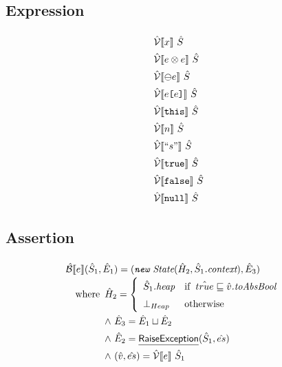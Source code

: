 \subsection{Expression}
\[
\renewcommand\arraystretch{1.5}
\begin{array}{l}

\aV \lbr x \rbr\ \hat{S} \\
\aV \lbr e \inop e \rbr\ \hat{S} \\
\aV \lbr \preop e \rbr\ \hat{S} \\
\aV \lbr e\verb+[+e\verb+]+ \rbr\ \hat{S} \\
\aV \lbr \TT{this} \rbr\ \hat{S} \\
\aV \lbr n \rbr\ \hat{S} \\
\aV \lbr ``s" \rbr\ \hat{S} \\
\aV \lbr \TT{true} \rbr\ \hat{S} \\
\aV \lbr \TT{false} \rbr\ \hat{S} \\
\aV \lbr \TT{null} \rbr\ \hat{S} \\

\end{array}
\]

\subsection{Assertion}
\[
\renewcommand\arraystretch{1.5}
\begin{array}{l}

\aB \lbr e \rbr (\hat{S}_1, \hat{E}_1) 
    = (\emph{\TT{new}\ State}(\hat{H}_2, \hat{S}_1\emph{.context}), \hat{E}_3) \\
\quad\wherec{
    \hat{H}_2 = \left \{
	\begin{array}{ll}
        \hat{S}_1\emph{.heap} & \ifc{\hat{true} \sqsubseteq \hat{v}\emph{.toAbsBool}} \\
	    \bot_{Heap} & \owc
    \end{array}  \right.\\
    \land\ \hat{E}_3 = \hat{E}_1 \sqcup \hat{E}_2 \\
    \land\ \hat{E}_2 = \chf{RaiseException}(\hat{S}_1, \hat{es}) \\
	\land\ (\hat{v}, \hat{es}) = \aV \lbr e \rbr\ \hat{S}_1
}\\\\

\end{array}
\]
